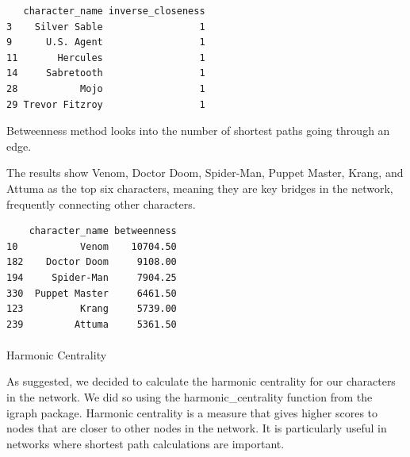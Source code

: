 \documentclass[
  letterpaper,
  DIV=11,
  numbers=noendperiod]{scrartcl}
\makeatletter
\let\oldparagraph\paragraph
\renewcommand{\paragraph}{
    \@ifstar
      \xxxParagraphStar
      \xxxParagraphNoStar
  }
\newcommand{\xxxParagraphStar}[1]{\oldparagraph*{#1}\mbox{}}
\newcommand{\xxxParagraphNoStar}[1]{\oldparagraph{#1}\mbox{}}
\newenvironment{Shaded}{\begin{snugshade}}{\end{snugshade}}
\newcommand{\AttributeTok}[1]{\textcolor[rgb]{0.40,0.45,0.13}{#1}}
\newcommand{\CommentTok}[1]{\textcolor[rgb]{0.37,0.37,0.37}{#1}}
\newcommand{\ConstantTok}[1]{\textcolor[rgb]{0.56,0.35,0.01}{#1}}
\newcommand{\FunctionTok}[1]{\textcolor[rgb]{0.28,0.35,0.67}{#1}}
\newcommand{\NormalTok}[1]{\textcolor[rgb]{0.00,0.23,0.31}{#1}}
\newcommand{\OtherTok}[1]{\textcolor[rgb]{0.00,0.23,0.31}{#1}}
\newcommand{\SpecialCharTok}[1]{\textcolor[rgb]{0.37,0.37,0.37}{#1}}
\makeatother
\begin{document}
\begin{verbatim}
   character_name inverse_closeness
3    Silver Sable                 1
9      U.S. Agent                 1
11       Hercules                 1
14     Sabretooth                 1
28           Mojo                 1
29 Trevor Fitzroy                 1
\end{verbatim}

Betweenness method looks into the number of shortest paths going through
an edge.

The results show Venom, Doctor Doom, Spider-Man, Puppet Master, Krang,
and Attuma as the top six characters, meaning they are key bridges in
the network, frequently connecting other characters.

\begin{Shaded}
\end{Shaded}

\begin{verbatim}
    character_name betweenness
10           Venom    10704.50
182    Doctor Doom     9108.00
194     Spider-Man     7904.25
330  Puppet Master     6461.50
123          Krang     5739.00
239         Attuma     5361.50
\end{verbatim}

\paragraph{Harmonic Centrality}\label{harmonic-centrality}

As suggested, we decided to calculate the harmonic centrality for our
characters in the network. We did so using the harmonic\_centrality
function from the igraph package. Harmonic centrality is a measure that
gives higher scores to nodes that are closer to other nodes in the
network. It is particularly useful in networks where shortest path
calculations are important.
\end{document}
